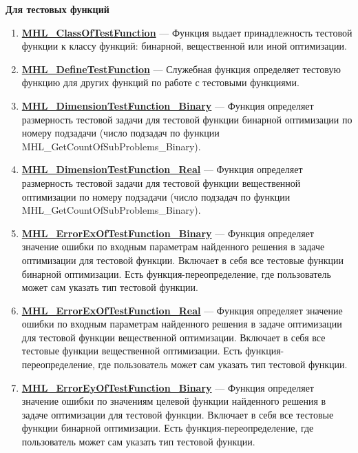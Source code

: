 \documentclass[a4paper,12pt]{article}
\begin{document}
\textbf{Для тестовых функций}
\begin{enumerate}

\item \textbf{\hyperref[MHL_ClassOfTestFunction]{MHL\_ClassOfTestFunction}} --- Функция выдает принадлежность тестовой функции к классу функций: бинарной, вещественной или иной оптимизации.

\item \textbf{\hyperref[MHL_DefineTestFunction]{MHL\_DefineTestFunction}} --- Служебная функция определяет тестовую функцию для других функций по работе с тестовыми функциями.

\item \textbf{\hyperref[MHL_DimensionTestFunction_Binary]{MHL\_DimensionTestFunction\_Binary}} --- Функция определяет размерность тестовой задачи для тестовой функции бинарной оптимизации по номеру подзадачи (число подзадач по функции MHL\_GetCountOfSubProblems\_Binary).

\item \textbf{\hyperref[MHL_DimensionTestFunction_Real]{MHL\_DimensionTestFunction\_Real}} --- Функция определяет размерность тестовой задачи для тестовой функции вещественной оптимизации по номеру подзадачи (число подзадач по функции MHL\_GetCountOfSubProblems\_Binary).

\item \textbf{\hyperref[MHL_ErrorExOfTestFunction_Binary]{MHL\_ErrorExOfTestFunction\_Binary}} --- Функция определяет значение ошибки по входным параметрам найденного решения в задаче оптимизации для тестовой функции. Включает в себя все тестовые функции бинарной оптимизации. Есть функция-переопределение, где пользователь может сам указать тип тестовой функции.

\item \textbf{\hyperref[MHL_ErrorExOfTestFunction_Real]{MHL\_ErrorExOfTestFunction\_Real}} --- Функция определяет значение ошибки по входным параметрам найденного решения в задаче оптимизации для тестовой функции вещественной оптимизации. Включает в себя все тестовые функции вещественной оптимизации. Есть функция-переопределение, где пользователь может сам указать тип тестовой функции.

\item \textbf{\hyperref[MHL_ErrorEyOfTestFunction_Binary]{MHL\_ErrorEyOfTestFunction\_Binary}} --- Функция определяет значение ошибки по значениям целевой функции найденного решения в задаче оптимизации для тестовой функции. Включает в себя все тестовые функции бинарной оптимизации. Есть функция-переопределение, где пользователь может сам указать тип тестовой функции.


\end{enumerate}
\end{document}
